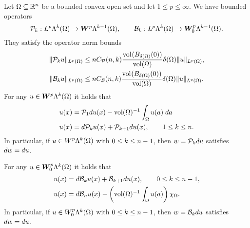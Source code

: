 \documentclass[10pt,a4paper]{article}
\begin{document}
\begin{theorem}\label{theorem:bogovpoinc}
    Let $\Omega \subseteq {\mathbb R}^{n}$ be a bounded convex open set and let $1 \leq p \leq \infty$. 
    We have bounded operators 
    \begin{align*}
        {\mathcal P}_{k} : L^{p}\Lambda^{k}(\Omega) \rightarrow \bm{W}^{p}\Lambda^{k-1}(\Omega)
        ,
        \qquad 
        {\mathcal B}_{k} : L^{p}\Lambda^{k}(\Omega) \rightarrow \bm{W}^{p}_{0}\Lambda^{k-1}(\Omega)
        .
    \end{align*}
    They satisfy the operator norm bounds 
    \begin{align*}
        \| {\mathcal P}_{k} u \|_{L^{p}(\Omega)}
        &\leq 
        n C_{{\mathcal P}}(n,k) \frac{ \operatorname{vol}_{}(B_{{\delta}(\Omega)}(0)) }{\operatorname{vol}(\Omega)} 
        {\delta}(\Omega)
        \| u \|_{L^{p}(\Omega)}
        ,
        \\
        \| {\mathcal B}_{k} u \|_{L^{p}(\Omega)}
        &\leq 
        n C_{{\mathcal B}}(n,k) \frac{ \operatorname{vol}_{}(B_{{\delta}(\Omega)}(0)) }{\operatorname{vol}(\Omega)} 
        {\delta}(\Omega)
        \| u \|_{L^{p}(\Omega)}
        .
    \end{align*}
    For any $u \in \bm{W}^{p}\Lambda^{k}(\Omega)$ it holds that 
    \begin{align}
        u(x) &= {\mathcal P}_{1} d u(x) - \operatorname{vol}(\Omega)^{-1} \int_\Omega u(a) \;da
        \label{math:theorem:bogovpoinc:poincare:zero}
        \\
        u(x) &= d {\mathcal P}_{k} u(x) + {\mathcal P}_{k+1} d u(x), \qquad 1 \leq k \leq n.
        \label{math:theorem:bogovpoinc:poincare:k}
    \end{align}
    In particular, if $u \in W^{p}    \Lambda^{k}(\Omega)$ with $0 \leq k \leq n-1$, then $w = {\mathcal P}_{k} d u$ satisfies $d w = d u$.
    
    For any $u \in \bm{W}^{p}_{0}\Lambda^{k}(\Omega)$ it holds that 
    \begin{align}
        u(x) &= d {\mathcal B}_{k} u(x) + {\mathcal B}_{k+1} d u(x), \qquad 0 \leq k \leq n-1,
        \label{math:theorem:bogovpoinc:bogov:k}
        \\
        u(x) &= d {\mathcal B}_{n} u(x) - \left( \operatorname{vol}(\Omega)^{-1} \int_{\Omega} u(a) \right) \chi_{\Omega}.
        \label{math:theorem:bogovpoinc:bogov:n}
    \end{align}
    In particular, if $u \in W^{p}_{0}\Lambda^{k}(\Omega)$ with $0 \leq k \leq n-1$, then $w = {\mathcal B}_{k} d u$ satisfies $d w = d u$.
    

\end{theorem}
\end{document}
